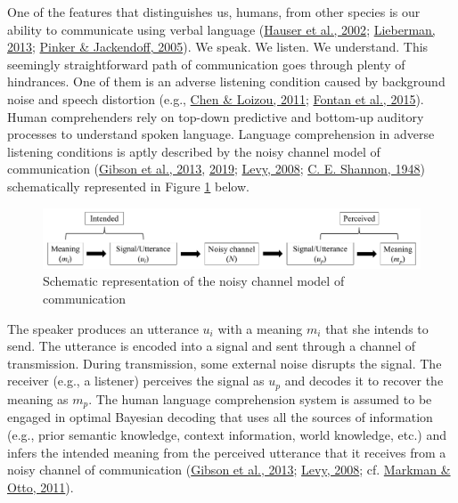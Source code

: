 \documentclass[a4paper, nobind]{templates/ociamthesis}
\begin{document}
One of the features that distinguishes us, humans, from other species is our ability to communicate using verbal language (\protect\hyperlink{ref-Hauser2002}{Hauser et al., 2002}; \protect\hyperlink{ref-Lieberman2013}{Lieberman, 2013}; \protect\hyperlink{ref-Pinker2005a}{Pinker \& Jackendoff, 2005}).
We speak. We listen. We understand.
This seemingly straightforward path of communication goes through plenty of hindrances.
One of them is an adverse listening condition caused by background noise and speech distortion (e.g., \protect\hyperlink{ref-Chen2011}{Chen \& Loizou, 2011}; \protect\hyperlink{ref-Fontan2015}{Fontan et al., 2015}).
Human comprehenders rely on top-down predictive and bottom-up auditory processes to understand spoken language.
Language comprehension in adverse listening conditions is aptly described by the noisy channel model of communication (\protect\hyperlink{ref-Gibson2013}{Gibson et al., 2013}, \protect\hyperlink{ref-Gibson2019}{2019}; \protect\hyperlink{ref-Levy2008}{Levy, 2008}; \protect\hyperlink{ref-Shannon1948}{C. E. Shannon, 1948})
schematically represented in Figure \ref{fig:noisy-channel} below.

\begin{figure}[!htpb]

{\centering \includegraphics[width=0.9\linewidth]{figures/materials/noisy-channel} 

}

\caption{Schematic representation of the noisy channel model of communication}\label{fig:noisy-channel}
\end{figure}

The speaker produces an utterance \(u_i\) with a meaning \(m_i\) that she intends to send.
The utterance is encoded into a signal and sent through a channel of transmission.
During transmission, some external noise disrupts the signal.
The receiver (e.g., a listener) perceives the signal as \(u_p\) and decodes it to recover the meaning as \(m_p\).
The human language comprehension system is assumed to be engaged in optimal Bayesian decoding that uses all the sources of information
(e.g., prior semantic knowledge, context information, world knowledge, etc.)
and infers the intended meaning from the perceived utterance that it receives from a noisy channel of communication (\protect\hyperlink{ref-Gibson2013}{Gibson et al., 2013}; \protect\hyperlink{ref-Levy2008}{Levy, 2008}; cf. \protect\hyperlink{ref-Markman2011}{Markman \& Otto, 2011}).
\end{document}
